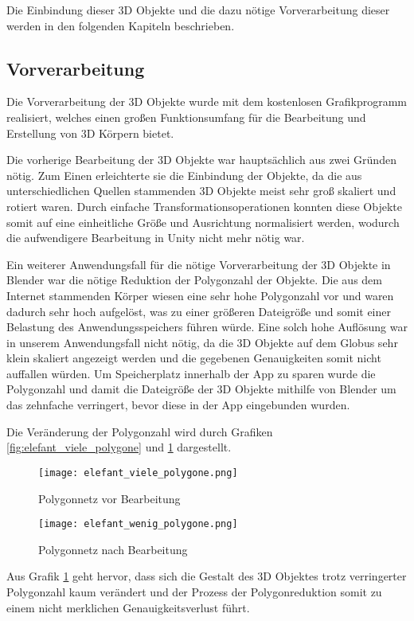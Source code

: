 Die Einbindung dieser 3D Objekte und die dazu nötige Vorverarbeitung dieser werden in den folgenden Kapiteln beschrieben.
\subsection{Vorverarbeitung}
Die Vorverarbeitung der 3D Objekte wurde mit dem kostenlosen Grafikprogramm  realisiert, welches einen großen Funktionsumfang für die Bearbeitung und Erstellung von 3D Körpern bietet. 

Die vorherige Bearbeitung der 3D Objekte war hauptsächlich aus zwei Gründen nötig. 
Zum Einen erleichterte sie die Einbindung der Objekte, da die aus unterschiedlichen Quellen stammenden 3D Objekte meist sehr groß skaliert und rotiert waren.
Durch einfache Transformationsoperationen konnten diese Objekte somit auf eine einheitliche Größe und Ausrichtung normalisiert werden, wodurch die aufwendigere Bearbeitung in Unity nicht mehr nötig war.

Ein weiterer Anwendungsfall für die nötige Vorverarbeitung der 3D Objekte in Blender war die nötige Reduktion der Polygonzahl der Objekte. 
Die aus dem Internet stammenden Körper wiesen eine sehr hohe Polygonzahl vor und waren dadurch sehr hoch aufgelöst, was zu einer größeren Dateigröße und somit einer Belastung des Anwendungsspeichers führen würde. 
Eine solch hohe Auflösung war in unserem Anwendungsfall nicht nötig, da die 3D Objekte auf dem Globus sehr klein skaliert angezeigt werden und die gegebenen Genauigkeiten somit nicht auffallen würden. 
Um Speicherplatz innerhalb der App zu sparen wurde die Polygonzahl und damit die Dateigröße der 3D Objekte mithilfe von Blender um das zehnfache verringert, bevor diese in der App eingebunden wurden.

Die Veränderung der Polygonzahl wird durch Grafiken \ref{fig:elefant_viele_polygone} und \ref{fig:elefant_wenig_polygone} dargestellt.

\begin{figure}[!htb]
  \texttt{[image: elefant\_viele\_polygone.png]}
  \caption{Polygonnetz vor Bearbeitung}\label{fig:elefant_viele_polygone}
\endminipage\hfill
{}
  \texttt{[image: elefant\_wenig\_polygone.png]}
  \caption{Polygonnetz nach Bearbeitung}\label{fig:elefant_wenig_polygone}
\endminipage\hfill
\end{figure}

Aus Grafik \ref{fig:elefant_wenig_polygone} geht hervor, dass sich die Gestalt des 3D Objektes trotz verringerter Polygonzahl kaum verändert und der Prozess der Polygonreduktion somit zu einem nicht merklichen Genauigkeitsverlust führt.
